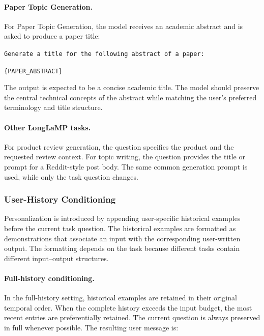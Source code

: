 \documentclass{article} %
\begin{document}
\paragraph{Paper Topic Generation.}
For Paper Topic Generation, the model receives an academic abstract and is asked to produce a paper title:

\begin{tcolorbox}[
    colback=gray!5,
    colframe=black!45,
    title=Paper Topic Generation question template,
    breakable,
    left=3pt,
    right=3pt,
    top=3pt,
    bottom=3pt
]
\small
\texttt{Generate a title for the following abstract of a paper:}

\texttt{\{PAPER\_ABSTRACT\}}
\end{tcolorbox}

The output is expected to be a concise academic title. The model should preserve the central technical concepts of the abstract while matching the user's preferred terminology and title structure.

\paragraph{Other LongLaMP tasks.}
For product review generation, the question specifies the product and the requested review context. For topic writing, the question provides the title or prompt for a Reddit-style post body. The same common generation prompt is used, while only the task question changes.

\subsubsection{User-History Conditioning}

Personalization is introduced by appending user-specific historical examples before the current task question. The historical examples are formatted as demonstrations that associate an input with the corresponding user-written output. The formatting depends on the task because different tasks contain different input--output structures.

\paragraph{Full-history conditioning.}
In the full-history setting, historical examples are retained in their original temporal order. When the complete history exceeds the input budget, the most recent entries are preferentially retained. The current question is always preserved in full whenever possible. The resulting user message is:
\end{document}
